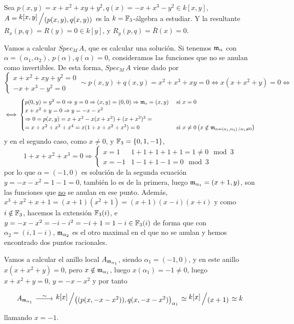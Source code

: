 \begin{ejem}
    Sea $p(x,y) = x+x^2+xy+y^2, q(x) = -x + x^3-y^2 \in k[x,y]$, $A = \modulo{k[x,y]}{(p(x,y),q(x,y))}$ es la $k=\mathbb{F}_3$-\'algebra a estudiar. Y la resultante $R_x(p,q) = R(y) =0 \in k[y]$, y $R_y(p,q) =\bar R(x) = 0$. 

    Vamos a calcular $Spec_M\, A$, que es calcular una soluci\'on. Si tenemos $\mathfrak{m}_{\alpha}$ con $\alpha=(\alpha_1, \alpha_2)$, $p(\alpha), q(\alpha)=0$, consideramos las funciones que no se anulan como invertibles. De esta forma, $Spec_M\, A$ viene dado por $$\begin{cases}
       x+x^2+xy+y^2 = 0 \\ -x + x^3-y^2 = 0
    \end{cases} \sim 
        p(x,y)+q(x,y)=x^2+x^3+xy =0 \iff x(x+x^2+y) = 0 \iff $$
        $$ \iff \begin{cases}
          p(0,y) = y^2 = 0 \Rightarrow y=0 \Rightarrow (x,y) = (0,0)\Rightarrow \mathfrak{m}_o = (x,y)  & \text{ si } x=0\\  x+x^2+y=0 \Rightarrow y = -x-x^2 \\ \Rightarrow 0 = p(x,y) = x+x^2-x(x+x^2) + (x+x^2)^2  = \\ = x+x^2+x^3+x^4 = x(1+x+x^2+x^3)=0 & \text{ si } x\neq 0 \left(x\notin \mathfrak{m}_{\alpha = (\alpha_1, \alpha_2)\, / \alpha_1\neq 0}\right)
        \end{cases}$$ 
        y en el segundo caso, como $x\neq 0$, y $\mathbb{F}_3 = \{0,1,-1\}$,
        $$1+x+x^2+x^3=0 \Rightarrow \begin{cases}
            x=1 & 1+1+1+1+1 = 1 \neq 0 \mod 3 \\ x=-1 & 1-1+1-1 = 0 \mod 3 
        \end{cases}$$
        por lo que $\alpha=(-1,0)$ es soluci\'on de la segunda ecuaci\'on $y=-x-x^2 = 1-1=0$, tambi\'en lo es de la primera, luego $\mathfrak{m}_{\alpha_1} = (x+1,y)$, son las funciones que \underline{no} se anulan en ese punto. Adem\'as, $x^3+x^2+x+1 = (x+1) (x^2+1) = (x+1)(x-i)(x+i)$ y como $i \notin \mathbb{F}_3$, hacemos la extensi\'on $\mathbb{F}_3(i)$, e $y = -x-x^2=-i-i^2 = -i+1=1-i \in \mathbb{F}_3(i)$ de forma que con $\alpha_2=(i,1-i)$, $\mathfrak{m}_{\alpha_2}$ es el otro maximal en el que no se anulan y hemos encontrado dos puntos racionales.

        Vamos a calcular el anillo local $A_{\mathfrak{m}_{\alpha_1}}$, siendo $\alpha_1=(-1,0)$, y en este anillo $x(x+x^2+y) = 0$, pero $x\notin \mathfrak{m}_{\alpha_1}$, luego $x(\alpha_1)=-1\neq 0$, luego $x+x^2+y=0, \, y=-x-x^2$ y por tanto
        $$\bt A_{\m_{\alpha_1}} \rar{\sim} & \modulo{k[x]}{\left((p(x,-x-x^2)), q(x, -x-x^2)\right)_{\alpha_1}} \simeq \modulo{k[x]}{(x+1)} \simeq k  \et$$
        llamando $x=-1$.


\end{ejem}

